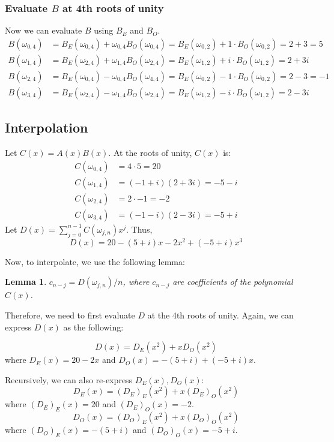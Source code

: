 \documentclass{article}
\newtheorem{lemma}{Lemma}
\begin{document}
\subsubsection{Evaluate $B$ at 4th roots of unity}
Now we can evaluate $B$ using $B_E$ and $B_O$.
\begin{align*}
B(\omega_{0,4}) &= B_E(\omega_{0,4}) + \omega_{0,4}B_O(\omega_{0,4}) = B_E(\omega_{0,2}) + 1\cdot B_O(\omega_{0,2}) =2+3=5 \\
B(\omega_{1,4}) &= B_E(\omega_{2,4}) + \omega_{1,4}B_O(\omega_{2,4})= B_E(\omega_{1,2}) + i\cdot B_O(\omega_{1,2}) =2+3i \\
B(\omega_{2,4}) &= B_E(\omega_{0,4}) - \omega_{0,4}B_O(\omega_{4,4}) =B_E(\omega_{0,2}) - 1\cdot B_O(\omega_{0,2}) =2-3=-1 \\
B(\omega_{3,4}) &= B_E(\omega_{2,4}) - \omega_{1,4}B_O(\omega_{2,4}) =B_E(\omega_{1,2}) - i\cdot B_O(\omega_{1,2}) =2-3i
\end{align*}



\subsection{Interpolation}


Let $C(x) = A(x)B(x)$. At the roots of unity, $C(x)$ is:
\begin{align*}
C(\omega_{0,4}) &= 4\cdot 5=20 \\
C(\omega_{1,4}) &= (-1+i)(2+3i)=-5-i\\
C(\omega_{2,4}) &= 2\cdot -1=-2\\
C(\omega_{3,4}) &= (-1-i)(2-3i)=-5+i
\end{align*}
Let $D(x)=\sum_{j=0}^{n-1}C(\omega_{j,n})x^j$. Thus,
$$D(x) = 20-(5+i)x-2x^2+(-5+i)x^3$$



Now, to interpolate, we use the following lemma:
\begin{lemma} $c_{n-j} = D(\omega_{j,n})/n$, where $c_{n-j}$ are coefficients of the polynomial $C(x)$.
\end{lemma}
Therefore, we need to first evaluate $D$ at the 4th roots of unity. Again, we can express $D(x)$ as the following:

$$D(x) = D_E(x^2) + xD_O(x^2)$$
where $D_E(x) = 20-2x$ and $D_O(x)=-(5+i)+(-5+i)x$.

Recursively, we can also re-express $D_E(x), D_O(x)$:
$$D_E(x) = (D_E)_E(x^2)+x(D_E)_O(x^2)$$
where $(D_E)_E(x) = 20$ and $(D_E)_O(x) = -2$.
$$D_O(x) = (D_O)_E(x^2)+x(D_O)_O(x^2)$$
where $(D_O)_E(x) = -(5+i)$ and $(D_O)_O(x) = -5+i$.
\end{document}
